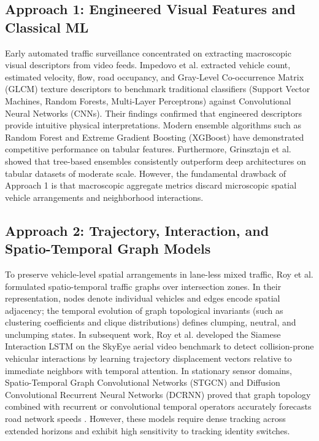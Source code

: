 \documentclass[conference]{IEEEtran}
\begin{document}
\subsection{Approach 1: Engineered Visual Features and Classical ML}
Early automated traffic surveillance concentrated on extracting macroscopic visual descriptors from video feeds. Impedovo et al. \cite{impedovo2019vehicular} extracted vehicle count, estimated velocity, flow, road occupancy, and Gray-Level Co-occurrence Matrix (GLCM) texture descriptors to benchmark traditional classifiers (Support Vector Machines, Random Forests, Multi-Layer Perceptrons) against Convolutional Neural Networks (CNNs). Their findings confirmed that engineered descriptors provide intuitive physical interpretations. Modern ensemble algorithms such as Random Forest \cite{breiman2001random} and Extreme Gradient Boosting (XGBoost) \cite{chen2016xgboost} have demonstrated competitive performance on tabular features. Furthermore, Grinsztajn et al. \cite{grinsztajn2022tree} showed that tree-based ensembles consistently outperform deep architectures on tabular datasets of moderate scale. However, the fundamental drawback of Approach 1 is that macroscopic aggregate metrics discard microscopic spatial vehicle arrangements and neighborhood interactions.

\subsection{Approach 2: Trajectory, Interaction, and Spatio-Temporal Graph Models}
To preserve vehicle-level spatial arrangements in lane-less mixed traffic, Roy et al. \cite{roy2020defining} formulated spatio-temporal traffic graphs over intersection zones. In their representation, nodes denote individual vehicles and edges encode spatial adjacency; the temporal evolution of graph topological invariants (such as clustering coefficients and clique distributions) defines clumping, neutral, and unclumping states. In subsequent work, Roy et al. \cite{roy2022detection} developed the Siamese Interaction LSTM on the SkyEye aerial video benchmark \cite{skyeye_repo} to detect collision-prone vehicular interactions by learning trajectory displacement vectors relative to immediate neighbors with temporal attention. In stationary sensor domains, Spatio-Temporal Graph Convolutional Networks (STGCN) \cite{yu2018spatio} and Diffusion Convolutional Recurrent Neural Networks (DCRNN) \cite{li2018diffusion} proved that graph topology combined with recurrent or convolutional temporal operators accurately forecasts road network speeds \cite{jiang2022graph}. However, these models require dense tracking across extended horizons and exhibit high sensitivity to tracking identity switches.
\end{document}
